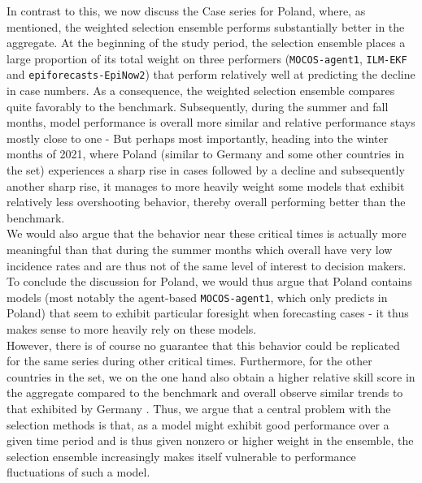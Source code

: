 In contrast to this, we now discuss the Case series for Poland, where, as mentioned, the weighted selection ensemble performs substantially better in the aggregate. At the beginning of the study period, the selection ensemble places a large proportion of its total weight on three performers (\texttt{MOCOS-agent1}, \texttt{ILM-EKF} and \texttt{epiforecasts-EpiNow2}) that perform relatively well at predicting the decline in case numbers. As a consequence, the weighted selection ensemble compares quite favorably to the benchmark. Subsequently, during the summer and fall months, model performance is overall more similar and relative performance stays mostly close to one - %
But perhaps most importantly, heading into the winter months of 2021, where Poland (similar to Germany and some other countries in the set) experiences a sharp rise in cases followed by a decline and subsequently another sharp rise, it manages to more heavily weight some models that exhibit relatively less overshooting behavior, thereby overall performing better than the benchmark. \\We would also argue that the behavior near these critical times is actually more meaningful than that during the summer months which overall have very low incidence rates and are thus not of the same level of interest to decision makers. To conclude the discussion for Poland, we would thus argue that Poland contains models (most notably the agent-based \texttt{MOCOS-agent1}, which only predicts in Poland) that seem to exhibit particular foresight when forecasting cases - it thus makes sense to more heavily rely on these models. \\%
However, there is of course no guarantee that this behavior could be replicated for the same series during other critical times. Furthermore, for the other countries in the set, we on the one hand also obtain a higher relative skill score in the aggregate compared to the benchmark and overall observe similar trends to that exhibited by Germany . Thus, we argue that a central problem with the selection methods is that, as a model might exhibit good performance over a given time period and is thus given nonzero or higher weight in the ensemble, the selection ensemble increasingly makes itself vulnerable to performance fluctuations of such a model.\\ 
